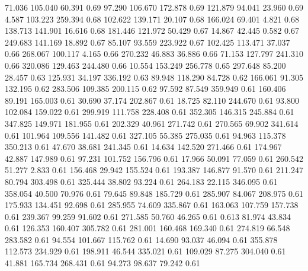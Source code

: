   71.036  105.040   60.391         0.69
  97.290  106.670  172.878         0.69
 121.879   94.041   23.960         0.69
   4.587  103.223  259.394         0.68
 102.622  139.171   20.107         0.68
 166.024   69.401    4.821         0.68
 138.713  141.901   16.616         0.68
 181.446  121.972   50.429         0.67
  14.867   42.445    0.582         0.67
 249.683  141.169   18.892         0.67
  85.107   93.559  223.922         0.67
 102.425  113.471   37.037         0.66
 268.067  100.117    4.165         0.66
 270.232   46.883   36.886         0.66
  71.153  127.797  241.310         0.66
 320.086  129.463  244.480         0.66
  10.554  153.249  256.778         0.65
 297.648   85.200   28.457         0.63
 125.931   34.197  336.192         0.63
  89.948  118.290   84.728         0.62
 166.061   91.305  132.195         0.62
 283.506  109.385  200.115         0.62
  97.592   87.549  359.949         0.61
 160.406   89.191  165.003         0.61
  30.690   37.174  202.867         0.61
  18.725   82.110  244.670         0.61
  93.800  102.084  159.022         0.61
 299.919  111.758  228.408         0.61
 352.305  146.315  245.884         0.61
 347.825  149.971  181.955         0.61
 202.329   40.961  271.742         0.61
 270.565   69.902  341.614         0.61
 101.964  109.556  141.482         0.61
 327.105   55.385  275.035         0.61
  94.963  115.378  350.213         0.61
  47.670   38.681  241.345         0.61
  14.634  142.520  271.466         0.61
 174.967   42.887  147.989         0.61
  97.231  101.752  156.796         0.61
  17.966   50.091   77.059         0.61
 260.542   51.277    2.833         0.61
 156.468   29.942  155.524         0.61
 193.387  146.877   91.570         0.61
 211.247   80.794  303.498         0.61
 325.444   38.802   93.224         0.61
 264.183   22.115  346.095         0.61
 358.054   40.500   70.976         0.61
  79.645   89.848  185.729         0.61
 285.907   84.067  208.975         0.61
 175.933  134.451   92.698         0.61
 285.955   74.609  335.867         0.61
 163.063  107.759  157.738         0.61
 239.367   99.259   91.602         0.61
 271.585   50.760   46.265         0.61
   0.613   81.974   43.834         0.61
 126.353  160.407  305.782         0.61
 281.001  160.468  169.340         0.61
 274.819   66.548  283.582         0.61
  94.554  101.667  115.762         0.61
  14.690   93.037   46.094         0.61
 355.878  112.573  234.929         0.61
 198.911   46.544  335.021         0.61
 109.029   87.275  304.040         0.61
  41.881  165.734  268.431         0.61
  94.273   98.637   79.242         0.61
